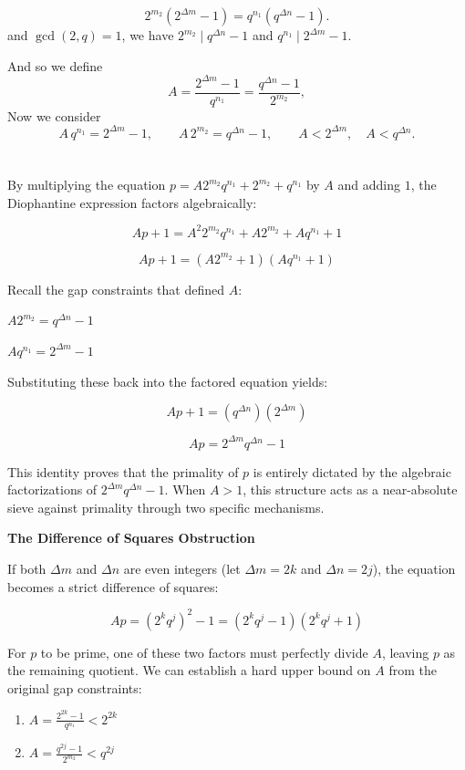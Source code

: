 \documentclass{article}
\begin{document}
\[
2^{m_2}\left(2^{\Delta m} - 1\right) = q^{n_1}\left(q^{\Delta n} - 1\right).
\]
and  $\gcd(2,q) = 1$, we have $2^{m_2} \mid q^{\Delta n} - 1$ and $q^{n_1} \mid 2^{\Delta m} - 1$.

And so we define
\[
A = \frac{2^{\Delta m} - 1}{q^{n_1}} = \frac{q^{\Delta n} - 1}{2^{m_2}},
\]
Now we consider
\[
A\,q^{n_1} = 2^{\Delta m} - 1, \qquad A\,2^{m_2} = q^{\Delta n} - 1, \qquad A < 2^{\Delta m}, \quad A < q^{\Delta n}.
\]
\section{}

By multiplying the equation $p = A 2^{m_2} q^{n_1} + 2^{m_2} + q^{n_1}$ by $A$ and adding $1$, the Diophantine expression factors algebraically:

$$Ap + 1 = A^2 2^{m_2} q^{n_1} + A 2^{m_2} + A q^{n_1} + 1$$

$$Ap + 1 = (A 2^{m_2} + 1)(A q^{n_1} + 1)$$

Recall the gap constraints that defined $A$:

$A 2^{m_2} = q^{\Delta n} - 1$

$A q^{n_1} = 2^{\Delta m} - 1$

Substituting these back into the factored equation yields:

$$Ap + 1 = (q^{\Delta n})(2^{\Delta m})$$

$$Ap = 2^{\Delta m} q^{\Delta n} - 1$$

This identity proves that the primality of $p$ is entirely dictated by the algebraic factorizations of $2^{\Delta m} q^{\Delta n} - 1$. When $A > 1$, this structure acts as a near-absolute sieve against primality through two specific mechanisms.

\textbf{The Difference of Squares Obstruction}

If both $\Delta m$ and $\Delta n$ are even integers (let $\Delta m = 2k$ and $\Delta n = 2j$), the equation becomes a strict difference of squares:

$$Ap = (2^k q^j)^2 - 1 = (2^k q^j - 1)(2^k q^j + 1)$$

For $p$ to be prime, one of these two factors must perfectly divide $A$, leaving $p$ as the remaining quotient. We can establish a hard upper bound on $A$ from the original gap constraints:

\begin{enumerate}
    \item $A = \frac{2^{2k} - 1}{q^{n_1}} < 2^{2k}$
    \item $A = \frac{q^{2j} - 1}{2^{m_2}} < q^{2j}$
\end{enumerate}
\end{document}
